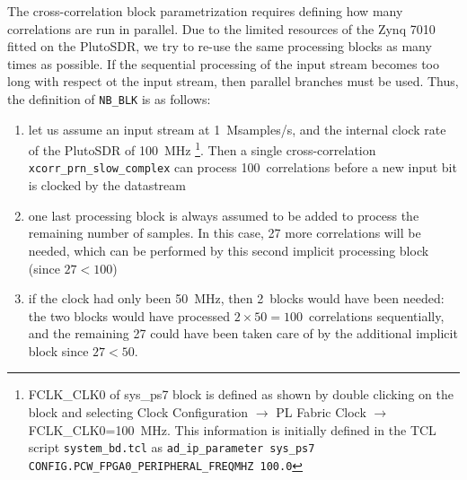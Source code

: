 \documentclass{article}
\begin{document}
The cross-correlation block parametrization requires defining how many correlations are run
in parallel. Due to the limited resources of the Zynq 7010 fitted on the PlutoSDR, we try to
re-use the same processing blocks as many times as possible. If the sequential processing of the
input stream becomes too long with respect ot the input stream, then parallel branches must
be used. Thus, the definition of {\tt NB\_BLK} is as follows:
\begin{enumerate}
\item let us assume an input stream at 1~Msamples/s, and the internal clock rate of the PlutoSDR
of 100~MHz
\footnote{
FCLK\_CLK0 of sys\_ps7 block is defined as shown by double clicking on the block
and selecting Clock Configuration $\rightarrow$ PL Fabric Clock $\rightarrow$ FCLK\_CLK0=100~MHz.
This information is initially defined in the TCL script {\tt system\_bd.tcl} as
{\tt ad\_ip\_parameter sys\_ps7 CONFIG.PCW\_FPGA0\_PERIPHERAL\_FREQMHZ 100.0}}. 
Then a single cross-correlation {\tt xcorr\_prn\_slow\_complex} can process 
100~correlations before a new input bit is clocked by the datastream
\item one last processing block is always assumed to be added to process the remaining number
of samples. In this case, 27 more correlations will be needed, which can be performed by this
second implicit processing block (since $27<100$)
\item if the clock had only been 50~MHz, then 2~blocks would have been needed: the two blocks
would have processed $2\times 50=100$~correlations sequentially, and the remaining 27 could have
been taken care of by the additional implicit block since $27<50$.
\end{enumerate}
\end{document}
